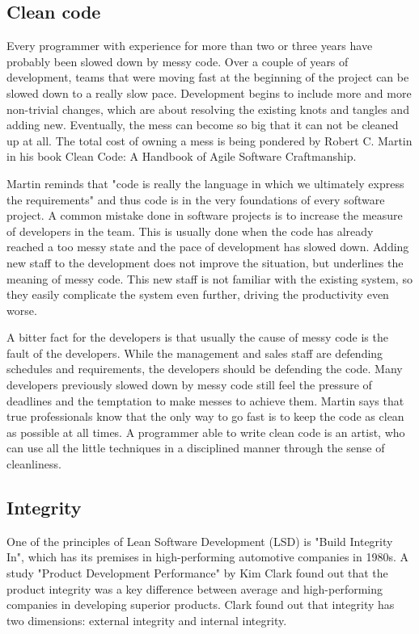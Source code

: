  \subsection{Clean code} 

 Every programmer with experience for more than two or three years have probably been slowed down by messy code. Over a couple of years of development, teams that were moving fast at the beginning of the project can be slowed down to a really slow pace. Development begins to include more and more non-trivial changes, which are about resolving the existing knots and tangles and adding new. Eventually, the mess can become so big that it can not be cleaned up at all. The total cost of owning a mess is being pondered by Robert C. Martin in his book Clean Code: A Handbook of Agile Software Craftmanship.~\cite{martin2008clean}

 Martin reminds that "code is really the language in which we ultimately express the requirements" and thus code is in the very foundations of every software project. A common mistake done in software projects is to increase the measure of developers in the team. This is usually done when the code has already reached a too messy state and the pace of development has slowed down. Adding new staff to the development does not improve the situation, but underlines the meaning of messy code. This new staff is not familiar with the existing system, so they easily complicate the system even further, driving the productivity even worse.~\cite{martin2008clean}

 A bitter fact for the developers is that usually the cause of messy code is the fault of the developers. While the management and sales staff are defending schedules and requirements, the developers should be defending the code. Many developers previously slowed down by messy code still feel the pressure of deadlines and the temptation to make messes to achieve them. Martin says that true professionals know that the only way to go fast is to keep the code as clean as possible at all times. A programmer able to write clean code is an artist, who can use all the little techniques in a disciplined manner through the sense of cleanliness.~\cite{martin2008clean}
 
 \subsection{Integrity} 

 One of the principles of Lean Software Development (LSD) is "Build Integrity In", which has its premises in high-performing automotive companies in 1980s. A study "Product Development Performance" by Kim Clark found out that the product integrity was a key difference between average and high-performing companies in developing superior products. Clark found out that integrity has two dimensions: external integrity and internal integrity.~\cite{clark1991product}

